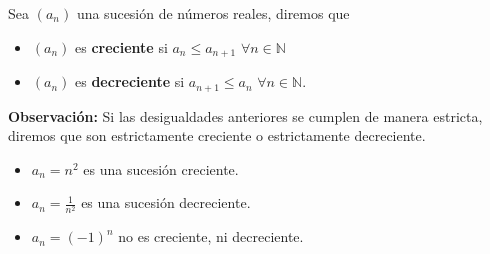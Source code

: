 \documentclass[12pt]{book}
\begin{document}
\begin{defi}{}{}
    Sea $(a_n)$ una sucesión de números reales, diremos que
    \begin{itemize}
        \item $(a_n)$ es \textbf{creciente} si $a_n \leq a_{n+1}$ $\forall n \in \mathbb{N}$
        \item $(a_n)$ es \textbf{decreciente} si $a_{n+1}\leq a_n$ $\forall n \in \mathbb{N}$.
    \end{itemize}
\end{defi}
\textbf{Observación:} Si las desigualdades anteriores se cumplen de manera estricta, diremos que son estrictamente creciente o estrictamente decreciente.
\begin{eje}{}{}
    \begin{itemize}
        \item $a_n= n^2$ es una sucesión creciente.
        \item $a_n= \frac{1}{n^2}$ es una sucesión decreciente.
        \item $a_n=(-1)^n$ no es creciente, ni decreciente.
    \end{itemize}
\end{eje}
\end{document}
